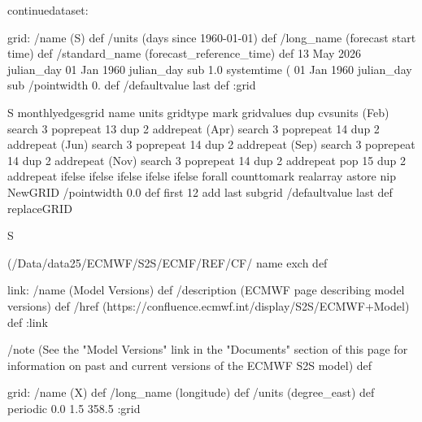 \begin{ingrid}
continuedataset:


grid:
/name (S) def
/units (days since 1960-01-01) def
/long_name (forecast start time) def
/standard_name (forecast_reference_time) def
13 May 2026 julian_day 01 Jan 1960 julian_day sub
1.0
systemtime
(%
01 Jan 1960 julian_day sub
/pointwidth 0. def
/defaultvalue { last } def
:grid

S monthlyedgesgrid
   name units gridtype mark gridvalues
        {dup cvsunits (Feb) search {3 {pop}repeat 13 {dup 2 add}repeat}{ 
         (Apr) search {3 {pop}repeat 14 {dup 2 add}repeat} { 
            (Jun) search {3 {pop}repeat 14 {dup 2 add}repeat} { 
               (Sep) search {3 {pop}repeat 14 {dup 2 add}repeat} { 
                  (Nov) search {3 {pop}repeat 14 {dup 2 add}repeat} 
                     {pop 15 {dup 2 add}repeat}
                     ifelse}
                  ifelse}
               ifelse}
            ifelse}
         ifelse
         }forall counttomark realarray astore
        nip NewGRID
    /pointwidth 0.0 def
    first 12 add last subgrid
    /defaultvalue { last } def
    replaceGRID


S {(/Data/data25/ECMWF/S2S/ECMF/REF/CF/%
name exch def



link:
 /name (Model Versions) def
 /description (ECMWF page describing model versions) def
 /href (https://confluence.ecmwf.int/display/S2S/ECMWF+Model) def
:link

/note (See the "Model Versions" link in the "Documents" section of this page for information on past and current versions of the ECMWF S2S model) def

grid:
/name (X) def
/long_name (longitude) def
/units (degree_east) def
periodic
0.0 1.5 358.5
:grid

}
\end{ingrid}
